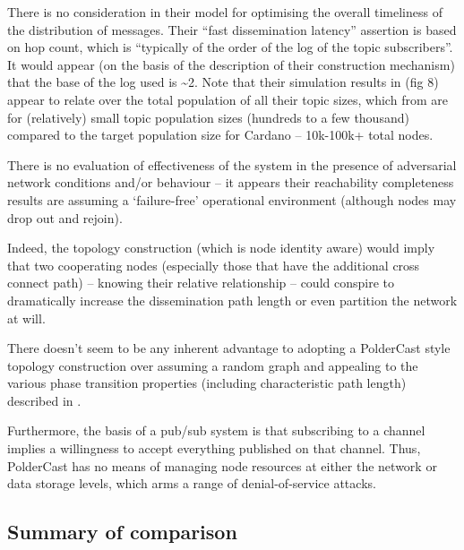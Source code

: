 \documentclass[11pt,a4paper]{article}
\begin{document}
There is no consideration in their model for optimising the overall
timeliness of the distribution of messages. Their ``fast dissemination
latency'' assertion is based on hop count, which is ``typically of the
order of the log of the topic subscribers''. It would appear (on the
basis of the description of their construction mechanism) that the base
of the log used is \textasciitilde{}2. Note that their simulation
results in \cite[Section 6.4]{SSVV12} (fig 8) appear to relate over the total
population of all their topic sizes, which from \cite[Section 6.2 fig 7]{SSVV12}
are for (relatively) small topic population sizes (hundreds to a few
thousand) compared to the target population size for Cardano --
10k-100k+ total nodes.

There is no evaluation of effectiveness of the system in the presence of
adversarial network conditions and/or behaviour -- it appears their
reachability completeness results are assuming a `failure-free'
operational environment (although nodes may drop out and rejoin).

Indeed, the topology construction (which is node identity aware) would
imply that two cooperating nodes (especially those that have the
additional cross connect path) -- knowing their relative relationship --
could conspire to dramatically increase the dissemination path length or
even partition the network at will.

There doesn't seem to be any inherent advantage to adopting a PolderCast
style topology construction over assuming a random graph and appealing
to the various phase transition properties (including characteristic
path length) described in \cite{Watts99}.

Furthermore, the basis of a pub/sub system is that subscribing to a
channel implies a willingness to accept everything published on that
channel. Thus, PolderCast has no means of managing node resources at
either the network or data storage levels, which arms a range of
denial-of-service attacks.

\subsection{Summary of comparison}
\label{summary-of-comparison}
\end{document}
